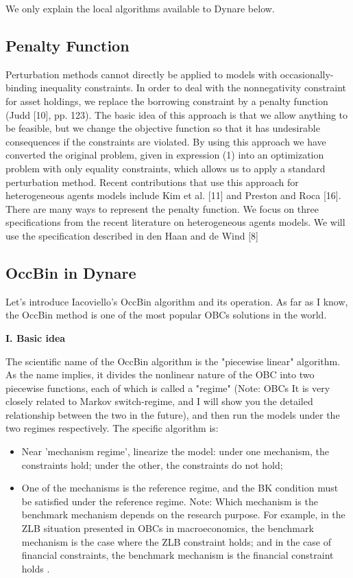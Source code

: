 \documentclass[10pt,math=newtx,citestyle=gb7714-2015,bibstyle=gb7714-2015]{elegantbook}
\begin{document}
{We only explain the local algorithms available to Dynare below.
\subsection{Penalty Function}
Perturbation methods cannot directly be applied to models
with occasionally-binding inequality constraints. In order to deal with the nonnegativity
constraint for asset holdings, we replace the borrowing constraint by a
penalty function (Judd [10], pp. 123). The basic idea of this approach is that we
allow anything to be feasible, but we change the objective function so that it has
undesirable consequences if the constraints are violated. By using this approach
we have converted the original problem, given in expression (1) into an optimization
problem with only equality constraints, which allows us to apply a standard
perturbation method. Recent contributions that use this approach for heterogeneous
agents models include Kim et al. [11] and Preston and Roca [16]. There are
many ways to represent the penalty function. We focus on three specifications from
the recent literature on heterogeneous agents models. We will use the specification
described in den Haan and de Wind [8]

\subsection{OccBin in Dynare}

Let's introduce Iacoviello's OccBin algorithm and its operation. As far as I know, the OccBin method is one of the most popular OBCs solutions in the world.

\textbf{I. Basic idea}

The scientific name of the OccBin algorithm is the "piecewise linear" algorithm. As the name implies, it divides the nonlinear nature of the OBC into two piecewise functions, each of which is called a "regime" (Note: OBCs It is very closely related to Markov switch-regime, and I will show you the detailed relationship between the two in the future), and then run the models under the two regimes respectively. The specific algorithm is:

\begin{itemize}
	
	\item Near 'mechanism regime', linearize the model: under one mechanism, the constraints hold; under the other, the constraints do not hold;
	
	\item One of the mechanisms is the reference regime, and the BK condition must be satisfied under the reference regime. Note: Which mechanism is the benchmark mechanism depends on the research purpose. For example, in the ZLB situation presented in OBCs in macroeconomics, the benchmark mechanism is the case where the ZLB constraint holds; and in the case of financial constraints, the benchmark mechanism is the financial constraint holds .
	

\end{itemize}}
\end{document}
